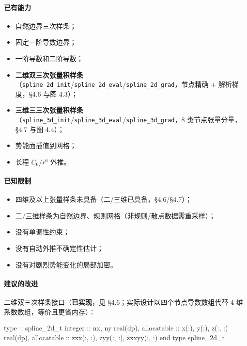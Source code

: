 \documentclass[
]{ctexbook}
\newenvironment{Shaded}{}{}
\newcommand{\DataTypeTok}[1]{\textcolor[rgb]{0.56,0.13,0.00}{#1}}
\newcommand{\DecValTok}[1]{\textcolor[rgb]{0.25,0.63,0.44}{#1}}
\newcommand{\NormalTok}[1]{#1}
\providecommand{\tightlist}{%
  \setlength{\itemsep}{0pt}\setlength{\parskip}{0pt}}
\begin{document}
\hypertarget{ux5df2ux6709ux80fdux529b-5}{%
\paragraph{已有能力}\label{ux5df2ux6709ux80fdux529b-5}}

\begin{itemize}
\tightlist
\item
  自然边界三次样条；
\item
  固定一阶导数边界；
\item
  一阶导数和二阶导数；
\item
  \textbf{二维双三次张量积样条}（\texttt{spline\_2d\_init}/\texttt{spline\_2d\_eval}/\texttt{spline\_2d\_grad}，节点精确
  + 解析梯度，§4.6 与图 4.3）；
\item
  \textbf{三维三三次张量积样条}（\texttt{spline\_3d\_init}/\texttt{spline\_3d\_eval}/\texttt{spline\_3d\_grad}，8
  类节点张量分量，§4.7 与图 4.4）；
\item
  势能面插值到网格；
\item
  长程 \(C_6/r^6\) 外推。
\end{itemize}

\hypertarget{ux5df2ux77e5ux9650ux5236-5}{%
\paragraph{已知限制}\label{ux5df2ux77e5ux9650ux5236-5}}

\begin{itemize}
\tightlist
\item
  四维及以上张量样条未具备（二/三维已具备，§4.6/§4.7）；
\item
  二/三维样条为自然边界、规则网格（非规则/散点数据需重采样）；
\item
  没有单调性约束；
\item
  没有自动外推不确定性估计；
\item
  没有对剧烈势能变化的局部加密。
\end{itemize}

\hypertarget{ux5efaux8baeux7684ux6539ux8fdb-4}{%
\paragraph{建议的改进}\label{ux5efaux8baeux7684ux6539ux8fdb-4}}

二维双三次样条接口（\textbf{已实现}，见
§4.6；实际设计以四个节点导数数组代替 4 维系数数组，等价且更省内存）：

\begin{Shaded}
\begin{Highlighting}[]
\DataTypeTok{type} \DataTypeTok{::}\NormalTok{ spline\_}\DecValTok{2}\NormalTok{d\_t}
    \DataTypeTok{integer} \DataTypeTok{::}\NormalTok{ nx, ny}
\DataTypeTok{    real(dp)}\NormalTok{, }\DataTypeTok{allocatable} \DataTypeTok{::}\NormalTok{ x(:), y(:), z(:, :)}
\DataTypeTok{    real(dp)}\NormalTok{, }\DataTypeTok{allocatable} \DataTypeTok{::}\NormalTok{ zxx(:, :), zyy(:, :), zxxyy(:, :)}
\DataTypeTok{end type}\NormalTok{ spline\_}\DecValTok{2}\NormalTok{d\_t}
\end{Highlighting}
\end{Shaded}
\end{document}
